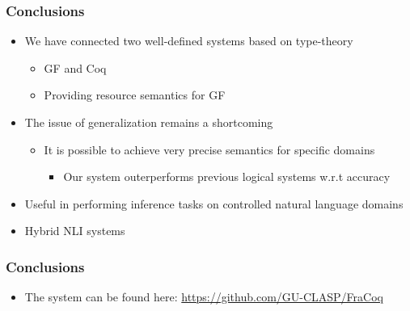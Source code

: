 \documentclass[11pt]{beamer}
\begin{document}
\begin{frame}[fragile]
	\frametitle{Conclusions}
	
	\begin{itemize}
		
		\item We have connected two well-defined systems based on
		type-theory
		
		\begin{itemize}
			
			\item GF and Coq
			
			\item Providing resource semantics for GF
		
		

\end{itemize}



\item The issue of generalization remains a shortcoming

	\begin{itemize}
		
		\item It is possible
		to achieve very precise semantics for specific domains

\begin{itemize}
	
	\item Our system outerperforms previous logical systems w.r.t accuracy
	
	

\end{itemize}\end{itemize}

\item Useful in performing inference tasks on controlled natural
language domains

\item Hybrid NLI systems



\end{itemize}

\end{frame}	


\begin{frame}[fragile]
	\frametitle{Conclusions}
	
	\begin{itemize}
		\item The system can be found here:  \href{https://github.com/GU-CLASP/FraCoq}{https://github.com/GU-CLASP/FraCoq}

\end{itemize}

\end{frame}	

	
\end{document}
